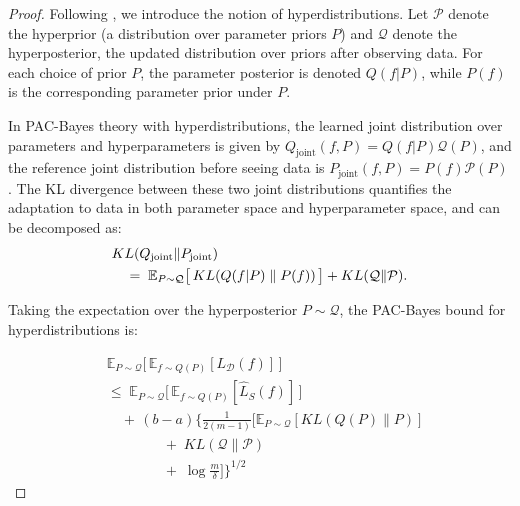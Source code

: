 \documentclass[letterpaper]{article} %
\begin{document}
\begin{proof}
Following \citep{pentinaPACBayesianBoundLifelong2014}, we introduce the notion of hyperdistributions. Let $\mathcal{P}$ denote the hyperprior (a distribution over parameter priors $P$) and $\mathcal{Q}$ denote the hyperposterior, the updated distribution over priors after observing data. For each choice of prior $P$, the parameter posterior is denoted $Q(f|P)$, while $P(f)$ is the corresponding parameter prior under $P$.

In PAC-Bayes theory with hyperdistributions, the learned joint distribution over parameters and hyperparameters is given by $Q_\text{joint}(f, P) = Q(f|P)\mathcal{Q}(P)$, and the reference joint distribution before seeing data is $P_\text{joint}(f, P) = P(f)\mathcal{P}(P)$. The KL divergence between these two joint distributions quantifies the adaptation to data in both parameter space and hyperparameter space, and can be decomposed as:
\begin{align}
& KL(Q_\text{joint} \| P_\text{joint}) \notag\\
&\quad =\; 
\mathbb{E}_{P \sim \mathcal{Q}} \big[\, KL(Q(f|P)\;\|\;P(f))\, \big] 
+ KL(\mathcal{Q} \| \mathcal{P}).
\end{align}



Taking the expectation over the hyperposterior $P \sim \mathcal{Q}$, the PAC-Bayes bound for hyperdistributions is:


\begin{equation}
\begin{aligned}
    & \mathbb{E}_{P \sim \mathcal{Q}} \Big[\, \mathbb{E}_{f \sim Q(P)} [L_{\mathcal{D}}(f)] \,\Big] \\
    &\leq\; \mathbb{E}_{P \sim \mathcal{Q}} \Big[\, \mathbb{E}_{f \sim Q(P)} [\hat{L}_{S}(f)] \,\Big] \\
    &\quad +\, (b-a)\Bigg\{
        \frac{1}{2(m-1)} \bigg[
            \mathbb{E}_{P \sim \mathcal{Q}}\left[ KL(Q(P)\|P) \right] \\
    &\qquad\qquad
            +\; KL(\mathcal{Q}\|\mathcal{P}) \\
    &\qquad\qquad
            +\; \log \frac{m}{\delta}
        \bigg]
    \Bigg\}^{1/2}
\end{aligned}
\end{equation}






\end{proof}
\end{document}
